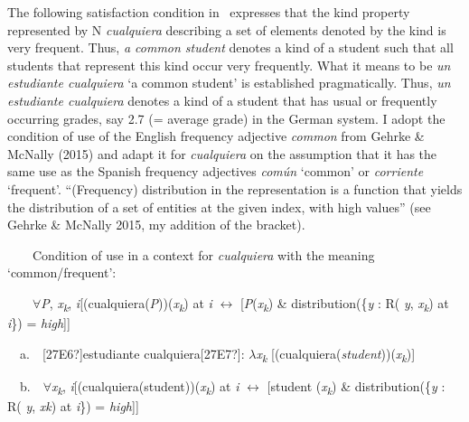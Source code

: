 \begin{styleStandard}
The following satisfaction condition in \ expresses that the kind property represented by N \textit{cualquiera} describing a set of elements denoted by the kind is very frequent. Thus, \textit{a common student }denotes a kind of a student such that all students that represent this kind occur very frequently. What it means to be \textit{un estudiante cualquiera} ‘a common student’ is established pragmatically. Thus, \textit{un estudiante cualquiera} denotes a kind of a student that has usual or frequently occurring grades, say 2.7 (= average grade) in the German system. I adopt the condition of use of the English frequency adjective \textit{common} from Gehrke \& McNally (2015) and adapt it for \textit{cualquiera} on the assumption that it has the same use as the Spanish frequency adjectives \textit{común} ‘common’\textit{ }or\textit{ corriente} ‘frequent’. “(Frequency) distribution in the representation is a function that yields the distribution of a set of entities at the given index, with high values” (see Gehrke \& McNally 2015, my addition of the bracket).
\end{styleStandard}

\begin{styleStandard}
\label{bkm:Ref54641377}\ \ \ \ Condition of use in a context for \textit{cualquiera} with the meaning ‘common/frequent’:
\end{styleStandard}

\begin{styleStandard}
\ \ \ \ ${\forall}$\textit{P}, \textit{x}\textit{\textsubscript{k}}, \textit{i}[(cualquiera(\textit{P}))(\textit{x}\textit{\textsubscript{k}}) at \textit{i }$\leftrightarrow $ [\textit{P}(\textit{x}\textit{\textsubscript{k}}) \& distribution(\{\textit{y }: R( \textit{y}, \textit{x}\textit{\textsubscript{k}}) at \textit{i}\}) = \textit{high}]]
\end{styleStandard}

\begin{styleStandard}
\ \ a.\ \ [27E6?]estudiante cualquiera[27E7?]: $\lambda $\textit{x}\textit{\textsubscript{k}} [(cualquiera(\textit{student}))(\textit{x}\textit{\textsubscript{k}})]
\end{styleStandard}

\begin{styleStandard}
\ \ b.\ \ ${\forall}$\textit{x}\textit{\textsubscript{k}}, \textit{i}[(cualquiera(student))(\textit{x}\textit{\textsubscript{k}}) at \textit{i }$\leftrightarrow $ [student (\textit{x}\textit{\textsubscript{k}}) \& distribution(\{\textit{y }: R( \textit{y}, \textit{xk}) at \textit{i}\}) = \textit{high}]]
\end{styleStandard}

